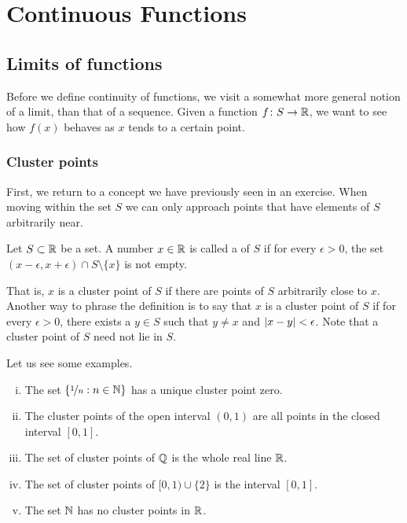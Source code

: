 \chapter{Continuous Functions} \label{lim:chapter}


\section{Limits of functions}
\label{sec:limoffunc}


Before we define continuity of functions, we visit a somewhat
more general notion of a limit, than that of a sequence.
Given a function $f \colon S \to
{\mathbb{R}}$, we want to see how $f(x)$ behaves as $x$ tends to a certain point.

\subsection{Cluster points}

First,
we return to a concept we have previously seen in an exercise.
When moving within the set $S$ we can only approach points
that have elements of $S$ arbitrarily near.

\begin{defn}
Let $S \subset {\mathbb{R}}$ be a set.  A number $x \in {\mathbb{R}}$ is called
a \emph{} of $S$
if for every $\epsilon > 0$, the set $(x-\epsilon,x+\epsilon) \cap S
\setminus \{ x \}$ is not empty.
\end{defn}

That is, $x$ is a cluster point of $S$ if there are points of $S$
arbitrarily close to $x$.  Another way to phrase the definition is to say
that $x$ is a cluster point of $S$ if for every $\epsilon > 0$, there
exists a $y \in S$ such that $y \not= x$ and $\left\lvert {x - y} \right\rvert < \epsilon$.
Note that a cluster point of $S$ need not lie in $S$.

Let us see some examples.
\begin{enumerate}[(i)]
\item The set
$\{ \nicefrac{1}{n} : n \in {\mathbb{N}} \}$ has a unique cluster point zero.
\item The cluster points of the open interval $(0,1)$ are
all points in the closed interval $[0,1]$.
\item
The set of cluster points of ${\mathbb{Q}}$ is the whole real line ${\mathbb{R}}$.
\item 
The set of cluster points of $[0,1) \cup \{ 2 \}$ is the interval $[0,1]$.
\item The set ${\mathbb{N}}$ has no cluster points in ${\mathbb{R}}$.
\end{enumerate}


